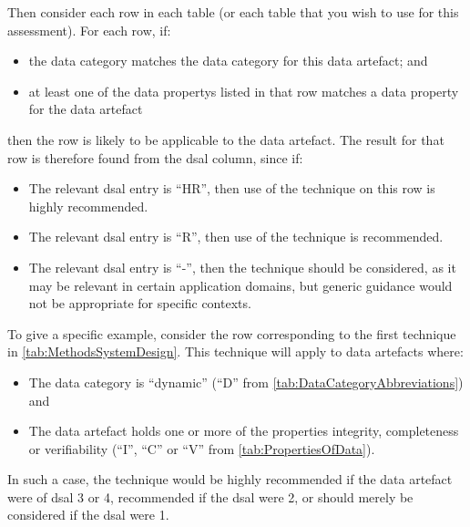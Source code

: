 Then consider each row in each table (or each table that you wish to use for this assessment). For each row, if:
\begin{itemize}
    \item the data category matches the data category for this \cbstart\gls{data artefact}\cbend; and
    \item at least one of the \glspl{data property} listed in that row matches a \gls{data property} for the \cbstart\gls{data artefact}\cbend 
\end{itemize}
then the row is likely to be applicable to the \cbstart\gls{data artefact}\cbend. The result for that row is therefore found from the \gls{dsal} column, since if:
\begin{itemize}
    \item The relevant \gls{dsal} entry is ``HR'', then use of the technique on this row is highly recommended.
    \item The relevant \gls{dsal} entry is ``R'', then use of the technique is recommended.
    \item The relevant \gls{dsal} entry is ``-'', then the technique should be considered, as it may be relevant in certain application domains, but \cbstart generic guidance would not be appropriate for specific contexts\cbend.
\end{itemize}

To give a specific example, consider the row corresponding to the first technique in \autoref{tab:MethodsSystemDesign}. This technique will apply to \glspl{data artefact} where:
\begin{itemize}
    \item The data category is ``dynamic'' (``D'' from \autoref{tab:DataCategoryAbbreviations}) and
    \item The \gls{data artefact} holds one or more of the properties \gls{integrity}, \gls{completeness} or \gls{verifiability} (``I'', ``C'' or ``V'' from \autoref{tab:PropertiesOfData}).
\end{itemize}
In such a case, the technique would be highly recommended if the \gls{data artefact} were of \gls{dsal} 3 or 4, recommended if the \gls{dsal} were 2, or should merely be considered if the \gls{dsal} were 1.

